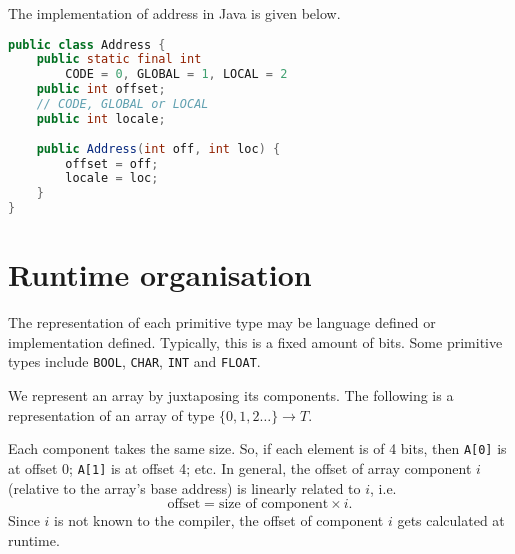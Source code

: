 \documentclass[a4paper, openany]{memoir}
\begin{document}
The implementation of address in Java is given below.
\begin{lstlisting}[language=java]
public class Address {
    public static final int 
        CODE = 0, GLOBAL = 1, LOCAL = 2
    public int offset;
    // CODE, GLOBAL or LOCAL
    public int locale; 
    
    public Address(int off, int loc) {
        offset = off; 
        locale = loc;
    }
}
\end{lstlisting}
\newpage

\section{Runtime organisation}
The representation of each primitive type may be language defined or implementation defined. Typically, this is a fixed amount of bits. Some primitive types include \texttt{BOOL}, \texttt{CHAR}, \texttt{INT} and \texttt{FLOAT}.

We represent an array by juxtaposing its components. The following is a representation of an array of type $\{0, 1, 2 \dots\} \to T$.
\begin{figure}[H]
    \centering
\end{figure}
\noindent Each component takes the same size. So, if each element is of 4 bits, then \texttt{A[0]} is at offset 0; \texttt{A[1]} is at offset 4; etc. In general, the offset of array component $i$ (relative to the array's base address) is linearly related to $i$, i.e.
\[\text{offset} = \text{size of component} \times i.\]
Since $i$ is not known to the compiler, the offset of component $i$ gets calculated at runtime.
\end{document}
